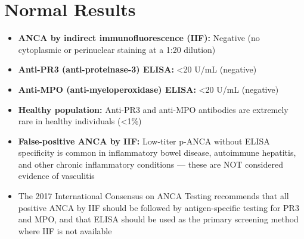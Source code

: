 \section*{Normal Results}
\begin{itemize}
  \item \textbf{ANCA by indirect immunofluorescence (IIF):} Negative (no cytoplasmic or perinuclear staining at a 1:20 dilution)
  \item \textbf{Anti-PR3 (anti-proteinase-3) ELISA:} <20 U/mL (negative)
  \item \textbf{Anti-MPO (anti-myeloperoxidase) ELISA:} <20 U/mL (negative)
  \item \textbf{Healthy population:} Anti-PR3 and anti-MPO antibodies are extremely rare in healthy individuals (<1\%)
  \item \textbf{False-positive ANCA by IIF:} Low-titer p-ANCA without ELISA specificity is common in inflammatory bowel disease, autoimmune hepatitis, and other chronic inflammatory conditions --- these are NOT considered evidence of vasculitis
  \item The 2017 International Consensus on ANCA Testing recommends that all positive ANCA by IIF should be followed by antigen-specific testing for PR3 and MPO, and that ELISA should be used as the primary screening method where IIF is not available
\end{itemize}

